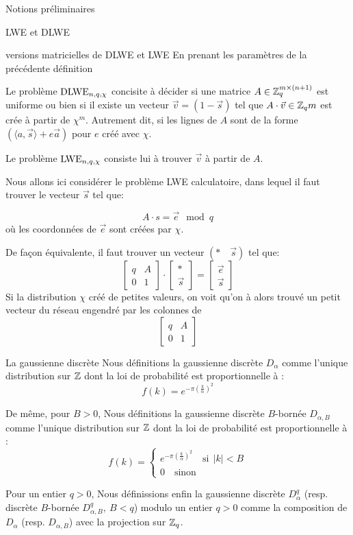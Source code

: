 \begin{section}{Notions préliminaires}
\begin{subsection}{LWE et DLWE}
	\begin{definition}{versions matricielles de DLWE et LWE}
	En prenant les paramètres de la précédente définition

	Le problème $\text{DLWE}_{n,q,\chi}$ concisite à décider 
	si une matrice $A \in \mathbb{Z}_q^{m \times (n+1)}$ 
	est uniforme ou bien si il existe un vecteur $\vec{v} = (1
	-\vec{s})$ tel que $A \cdot \vec{v} \in \mathbb{Z}_q{m}$ est 
	crée à partir de $\chi^m$. Autrement dit, si les lignes 
	de $A$ sont de la forme $(\langle a, \vec{s} \rangle + e \vec{a})$ 
	pour $e$ créé avec $\chi$.

	Le problème $\text{LWE}_{n,q,\chi}$ consiste lui à trouver $\vec{v}$ à partir de $A$.
	\end{definition}



	Nous allons ici considérer le problème LWE calculatoire, dans lequel il
	faut trouver le vecteur $\vec{s}$ tel que:

	\[ A\cdot s = \vec{e} \mod q \]
	où les coordonnées de $\vec{e}$ sont créées par $\chi$.

	De façon équivalente, il faut trouver un vecteur $(*\quad\vec{s})$ tel
	que:
	\[ \begin{bmatrix}q & A \\ 0 &1 \end{bmatrix}\cdot
	   \begin{bmatrix}* \\ \vec{s} \end{bmatrix} =
	   \begin{bmatrix} \vec{e} \\ \vec{s} \end{bmatrix} \]
	Si la distribution $\chi$ créé de petites valeurs, on voit qu'on à
	alors trouvé un \og petit \fg vecteur du réseau engendré par les colonnes de 
	\[ \begin{bmatrix}q & A \\ 0 &1 \end{bmatrix} \]
	\end{subsection}
	\begin{subsection}{La gaussienne discrète}
	Nous définitions la gaussienne discrète
	$D_\alpha$ comme l'unique distribution sur $\mathbb{Z}$ dont la loi de probabilité 
	est proportionnelle à :
	\[ f(k) = e^{-\pi {\left(\frac{k}{\alpha}\right)}^2}\]

	De même, pour $B > 0$, 
	Nous définitions la gaussienne discrète $B$-bornée $D_{\alpha,B}$ comme l'unique distribution sur $\mathbb{Z}$ dont la loi de probabilité 
	est proportionnelle à :
	\[ f(k) = \begin{cases}e^{-\pi {\left(\frac{k}{\alpha}\right)}^2}
	\quad\text{si}\:\: |k| < B \\ 0 \quad \text{sinon}\end{cases}\]

	Pour un entier $q > 0$,  
	Nous définissions enfin la gaussienne discrète $D^q_{\alpha}$ (resp. discrète
	$B$-bornée $D^q_{\alpha,B},\: B < q$) modulo un entier $q > 0$ comme la
	composition de $D_\alpha$ 
	(resp. $D_{\alpha,B}$) avec la projection sur $\mathbb{Z}_q$.
	\end{subsection}
\end{section}
